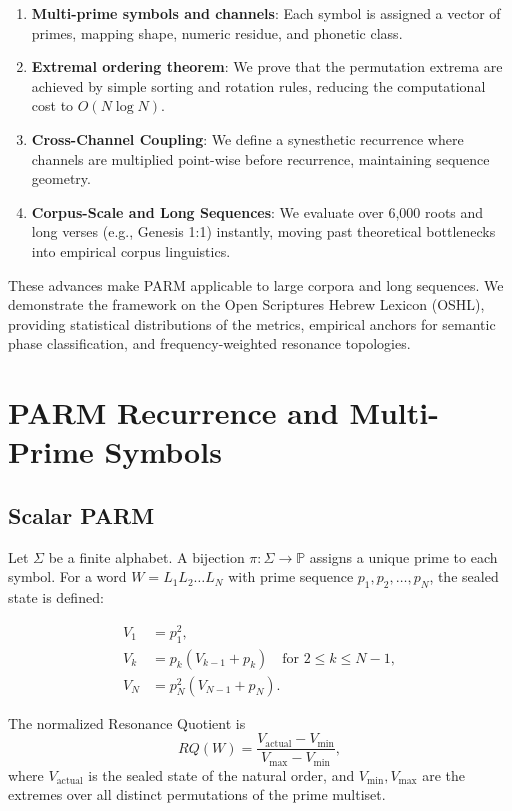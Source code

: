 \documentclass[12pt, a4paper]{article}
\begin{document}
\begin{enumerate}
\item \textbf{Multi-prime symbols and channels}: Each symbol is assigned a vector of primes, mapping shape, numeric residue, and phonetic class.
\item \textbf{Extremal ordering theorem}: We prove that the permutation extrema are achieved by simple sorting and rotation rules, reducing the computational cost to $O(N \log N)$. 
\item \textbf{Cross-Channel Coupling}: We define a synesthetic recurrence where channels are multiplied point-wise before recurrence, maintaining sequence geometry.
\item \textbf{Corpus-Scale and Long Sequences}: We evaluate over 6,000 roots and long verses (e.g., Genesis 1:1) instantly, moving past theoretical bottlenecks into empirical corpus linguistics.
\end{enumerate}

These advances make PARM applicable to large corpora and long sequences. We demonstrate the framework on the Open Scriptures Hebrew Lexicon (OSHL), providing statistical distributions of the metrics, empirical anchors for semantic phase classification, and frequency-weighted resonance topologies.

\section{PARM Recurrence and Multi-Prime Symbols}

\subsection{Scalar PARM}

Let $\Sigma$ be a finite alphabet. A bijection $\pi: \Sigma \to \mathbb{P}$ assigns a unique prime to each symbol. For a word $W = L_1 L_2 \dots L_N$ with prime sequence $p_1, p_2, \dots, p_N$, the sealed state is defined:

\[
\begin{aligned}
V_1 &= p_1^2, \\
V_k &= p_k (V_{k-1} + p_k) \quad \text{for } 2 \le k \le N-1, \\
V_N &= p_N^2 (V_{N-1} + p_N).
\end{aligned}
\]

The normalized Resonance Quotient is
\[
RQ(W) = \frac{V_{\text{actual}} - V_{\min}}{V_{\max} - V_{\min}},
\]
where $V_{\text{actual}}$ is the sealed state of the natural order, and $V_{\min}, V_{\max}$ are the extremes over all distinct permutations of the prime multiset.
\end{document}
